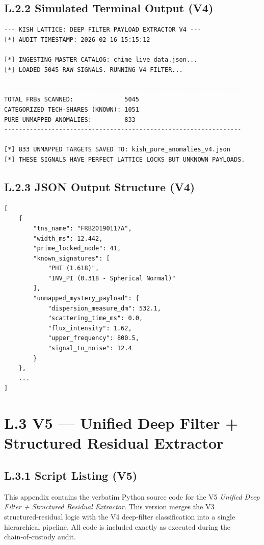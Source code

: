 \documentclass[11pt, letterpaper, openany]{book}
\begin{document}
\subsection*{L.2.2 Simulated Terminal Output (V4)}
\begin{lstlisting}[style=terminal]
--- KISH LATTICE: DEEP FILTER PAYLOAD EXTRACTOR V4 ---
[*] AUDIT TIMESTAMP: 2026-02-16 15:15:12

[*] INGESTING MASTER CATALOG: chime_live_data.json...
[*] LOADED 5045 RAW SIGNALS. RUNNING V4 FILTER...

-----------------------------------------------------------------
TOTAL FRBs SCANNED:              5045
CATEGORIZED TECH-SHARES (KNOWN): 1051
PURE UNMAPPED ANOMALIES:         833
-----------------------------------------------------------------

[*] 833 UNMAPPED TARGETS SAVED TO: kish_pure_anomalies_v4.json
[*] THESE SIGNALS HAVE PERFECT LATTICE LOCKS BUT UNKNOWN PAYLOADS.
\end{lstlisting}

\subsection*{L.2.3 JSON Output Structure (V4)}
\begin{lstlisting}[style=terminal]
[
    {
        "tns_name": "FRB20190117A",
        "width_ms": 12.442,
        "prime_locked_node": 41,
        "known_signatures": [
            "PHI (1.618)",
            "INV_PI (0.318 - Spherical Normal)"
        ],
        "unmapped_mystery_payload": {
            "dispersion_measure_dm": 532.1,
            "scattering_time_ms": 0.0,
            "flux_intensity": 1.62,
            "upper_frequency": 800.5,
            "signal_to_noise": 12.4
        }
    },
    ...
]
\end{lstlisting}

\section*{L.3 V5 — Unified Deep Filter + Structured Residual Extractor}

\subsection*{L.3.1 Script Listing (V5)}
This appendix contains the verbatim Python source code for the V5
\textit{Unified Deep Filter + Structured Residual Extractor}.  
This version merges the V3 structured‑residual logic with the V4 deep‑filter
classification into a single hierarchical pipeline.  
All code is included exactly as executed during the chain‑of‑custody audit.
\end{document}

